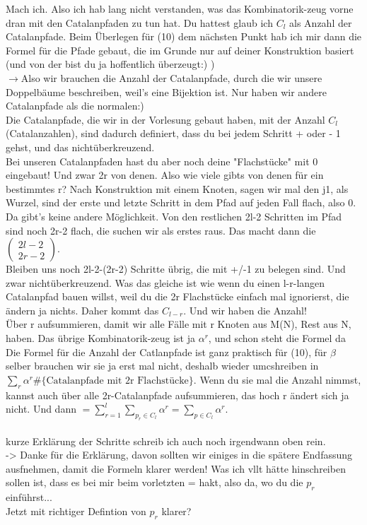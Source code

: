 \documentclass[a4paper, 11pt]{scrreprt}
\begin{document}
Mach ich. Also ich hab lang nicht verstanden, was das Kombinatorik-zeug vorne dran mit den Catalanpfaden zu tun hat. Du hattest glaub ich $C_l$ als Anzahl der Catalanpfade. Beim Überlegen für (10) dem nächsten Punkt hab ich mir dann die Formel für die Pfade gebaut, die im Grunde nur auf deiner Konstruktion basiert (und von der bist du ja hoffentlich überzeugt:) )\\
$ \longrightarrow $Also wir brauchen die Anzahl der Catalanpfade, durch die wir unsere Doppelbäume beschreiben, weil's eine Bijektion ist. Nur haben wir andere Catalanpfade als die normalen:)\\
Die Catalanpfade, die wir in der Vorlesung gebaut haben, mit der Anzahl $C_l$ (Catalanzahlen), sind dadurch definiert, dass du bei jedem Schritt + oder - 1 gehst, und das nichtüberkreuzend. \\ Bei unseren Catalanpfaden hast du aber noch deine "Flachstücke" mit 0 eingebaut! Und zwar 2r von denen. Also wie viele gibts von denen für ein bestimmtes r? Nach Konstruktion mit einem Knoten, sagen wir mal den j1, als Wurzel, sind der erste und letzte Schritt in dem Pfad auf jeden Fall flach, also 0. Da gibt's keine andere Möglichkeit. Von den restlichen 2l-2 Schritten im Pfad sind noch 2r-2 flach, die suchen wir als erstes raus. Das macht dann die $\begin{pmatrix} 2l-2\\2r-2\end{pmatrix} $.\\ 
Bleiben uns noch 2l-2-(2r-2) Schritte übrig, die mit +/-1 zu belegen sind. Und zwar nichtüberkreuzend. Was das gleiche ist wie wenn du einen l-r-langen Catalanpfad bauen willst, weil du die 2r Flachstücke einfach mal ignorierst, die ändern ja nichts. Daher kommt das $ C_{l-r} $. Und wir haben die Anzahl!\\ Über r aufsummieren, damit wir alle Fälle mit r Knoten aus M(N), Rest aus N, haben. Das übrige Kombinatorik-zeug ist ja $\alpha^r  $, und schon steht die Formel da\\
Die Formel für die Anzahl der Catlanpfade ist ganz praktisch für (10), für $ \beta$ selber brauchen wir sie ja erst mal nicht, deshalb wieder umcshreiben in $ \sum_{r} \alpha^{r} \#\{ \text{Catalanpfade mit 2r Flachstücke} \}$. Wenn du sie mal die Anzahl nimmst, kannst auch über alle 2r-Catalanpfade aufsummieren, das hoch r ändert sich ja nicht. Und dann $= \sum_{r=1}^{l} \sum_{p_{r} \in C_{l}} \alpha^{r} = \sum_{p\in C_l} \alpha^r $.\\ \\
kurze Erklärung der Schritte schreib ich auch noch irgendwann oben rein.\\
 -> Danke für die Erklärung, davon sollten wir einiges in die spätere Endfassung ausfnehmen, damit die Formeln klarer werden! Was ich vllt hätte hinschreiben sollen ist, dass es bei mir beim vorletzten = hakt, also da, wo du die \(p_r\) einführst... \\ Jetzt mit richtiger Defintion von $ p_r $ klarer? \\
\end{document}
